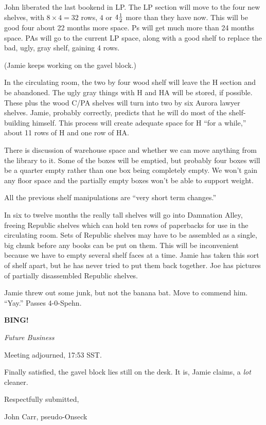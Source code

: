 \documentclass[12pt]{article}
\newcommand{\bing}{{\bf BING!} }
\newcommand{\goto}[1]{\bing \vskip 12pt \centerline{{\em{#1}}}}
\begin{document}
John liberated the last bookend in LP.   The LP section will move to the
four new shelves, with $8 \times 4 = 32$ rows, $4$ or $4 {1 \over 2}$
more than they have now.  This will be good four about 22 months more
space.  Ps will get much more than 24 months space.  PAs will go to the
current LP space, along with a good shelf to replace the bad, ugly, gray
shelf, gaining 4 rows.

(Jamie keeps working on the gavel block.)

In the circulating room, the two by four wood shelf will leave the H
section and be abandoned.  The ugly gray things with H and HA will be
stored, if possible.  These plus the wood C/PA shelves will turn into
two by six Aurora lawyer shelves.  Jamie, probably correctly, predicts
that he will do most of the shelf-building himself.  This process will
create adequate space for H ``for a while,'' about 11 rows of H and one
row of HA.

There is discussion of warehouse space and whether we can move anything
from the library to it.  Some of the boxes will be emptied, but probably
four boxes will be a quarter empty rather than one box being completely
empty.  We won't gain any floor space and the partially empty boxes won't
be able to support weight.

All the previous shelf manipulations are ``very short term changes.''

In six to twelve months the really tall shelves will go into Damnation
Alley, freeing Republic shelves which can hold ten rows of paperbacks
for use in the circulating room.  Sets of Republic shelves may have to
be assembled as a single, big chunk before any books can be put on them.
This will be inconvenient because we have to empty several shelf faces
at a time.  Jamie has taken this sort of shelf apart, but he has never
tried to put them back together.  Joe has pictures of partially disassembled
Republic shelves.


Jamie threw out some junk, but not the banana bat.
Move to commend him.  ``Yay.''  Passes \hbox{4-0-Spehn}.


\goto{Future Business}

\vspace{12pt}

\noindent
Meeting adjourned, 17:53 SST.

\vspace{12pt}

Finally satisfied, the gavel block lies still on the desk.
It is, Jamie claims, a {\em lot} cleaner.

\vspace{18pt}

\centerline{Respectfully submitted,}
\centerline{John Carr, pseudo-Onseck}
\end{document}
